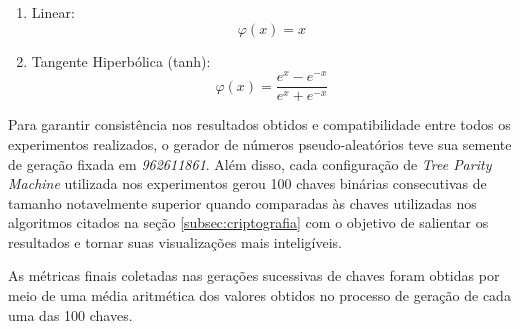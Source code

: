 \documentclass[a4paper,10pt,oneside,conference,final,keeplastbox]{inatel}
\begin{document}
\begin{enumerate}
\begin{enumerate}
                    \item Linear:
                        \begin{equation}
                            \label{eq:act_func_linear}
                            \textit{$\varphi(x)$} = x
                        \end{equation}
                    
                    \item Tangente Hiperbólica (tanh):
                        \begin{equation}
                            \label{eq:act_func_tanh}
                            \textit{$\varphi(x)$} = \frac{e^x - e^{-x}}{e^x + e^{-x}}
                        \end{equation}
                
                \end{enumerate}
            \end{enumerate}
            
            Para garantir consistência nos resultados obtidos e compatibilidade entre todos os experimentos realizados, o gerador de números pseudo-aleatórios teve sua semente de geração fixada em \textit{962611861}. Além disso, cada configuração de \textit{Tree Parity Machine} utilizada nos experimentos gerou 100 chaves binárias consecutivas de tamanho notavelmente superior quando comparadas às chaves utilizadas nos algoritmos citados na seção \ref{subsec:criptografia} com o objetivo de salientar os resultados e tornar suas visualizações mais inteligíveis.
            
            As métricas finais coletadas nas gerações sucessivas de chaves foram obtidas por meio de uma média aritmética dos valores obtidos no processo de geração de cada uma das 100 chaves.
\end{document}
